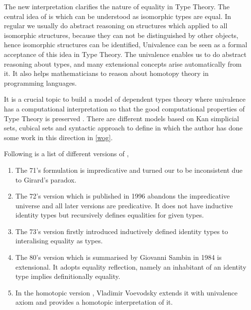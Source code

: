 The new interpretation clarifies the nature of equality in Type Theory.
The central idea of \hott is  which can be understood as isomorphic types are equal.
In regular \maths we usually do abstract reasoning on structures which applied to all isomorphic structures, because they can not be distinguished by other objects, hence isomorphic structures can be identified, Univalence can be seen as a formal acceptance of this idea in Type Theory. 
The univalence enables us to do abstract reasoning about types, and many extensional concepts arise automatically from it. It also helps mathematicians to reason about homotopy theory in programming languages.

It is a crucial topic to build a model of dependent types theory where univalence has a computational interpretation so that the good computational properties of Type Theory is preserved \cite{bezem2013model}. There are different models based on Kan simplicial sets, cubical sets and syntactic approach to define \wog in \itt which the author has done some work in this direction in \autoref{wog}.

Following is a list of different versions of \mltt,

\begin{enumerate}

\item The 71's formulation \cite{per:71} is impredicative and turned our to be inconsistent due to Girard's paradox.

\item The 72's version which is published in 1996 \cite{Martin-Lof-1972} abandons the impredicative universe and all later versions are predicative. It does not have inductive identity types but recursively defines equalities for given types.

\item The 73's version \cite{Martin-Lof-1973} firstly introduced inductively defined identity types to interalising equality as types. 

\item The 80's version which is summarised by Giovanni Sambin in 1984 \cite{martin1984intuitionistic} is extensional. It adopts equality reflection, namely an inhabitant of an identity type implies definitionally equality.

\item In the homotopic version \cite{hott}, Vladimir Voevodsky extends it with univalence axiom and provides a homotopic interpretation of it.

\end{enumerate}



